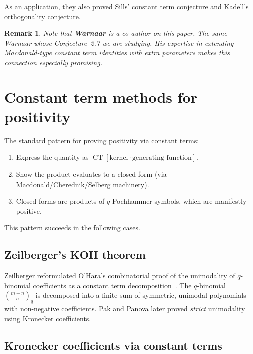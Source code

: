 \documentclass[11pt]{article}
\newtheorem{remark}[theorem]{Remark}
\newcommand{\CT}{\operatorname{CT}}
\begin{document}
As an application, they also proved Sills' constant term
conjecture and Kadell's orthogonality conjecture.

\begin{remark}
Note that \textbf{Warnaar} is a co-author on this paper.
The same Warnaar whose Conjecture~2.7 we are studying.
His expertise in extending Macdonald-type constant term
identities with extra parameters makes this connection
especially promising.
\end{remark}

\section{Constant term methods for positivity}
\label{sec:positivity}

The standard pattern for proving positivity via constant terms:

\begin{enumerate}
  \item Express the quantity as
    $\CT[\text{kernel} \cdot \text{generating function}]$.
  \item Show the product evaluates to a closed form
    (via Macdonald/Cherednik/Selberg machinery).
  \item Closed forms are products of $q$-Pochhammer symbols,
    which are manifestly positive.
\end{enumerate}

This pattern succeeds in the following cases.

\subsection{Zeilberger's KOH theorem}

Zeilberger reformulated O'Hara's combinatorial proof of the
unimodality of $q$-binomial coefficients as a constant term
decomposition~\cite{zeilberger-koh}. The $q$-binomial
$\binom{m+n}{n}_q$ is decomposed into a finite sum of
symmetric, unimodal polynomials with non-negative coefficients.
Pak and Panova later proved \emph{strict} unimodality using
Kronecker coefficients.

\subsection{Kronecker coefficients via constant terms}
\end{document}
